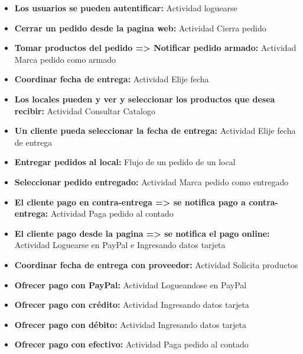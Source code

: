 \begin{itemize}
\item \textbf{Los usuarios se pueden autentificar:} Actividad loguearse
\item \textbf{Cerrar un pedido desde la pagina web:} Actividad Cierra pedido
\item \textbf{Tomar productos del pedido => Notificar pedido armado:} Actividad Marca pedido como armado
\item \textbf{Coordinar fecha de entrega:} Actividad Elije fecha
\item \textbf{Los locales pueden y ver y seleccionar los productos que desea recibir:} Actividad Consultar Catalogo
\item \textbf{Un cliente pueda seleccionar la fecha de entrega:} Actividad Elije fecha  de entrega
\item \textbf{Entregar pedidos al local:} Flujo de un pedido de un local
\item \textbf{Seleccionar pedido entregado:} Actividad Marca pedido como entregado
\item \textbf{El cliente pago en contra-entrega => se notifica pago a contra-entrega:} Actividad Paga pedido al contado
\item \textbf{El cliente pago desde la pagina => se notifica el pago online:} Actividad Loguearse en PayPal e Ingresando datos tarjeta
\item \textbf{Coordinar fecha de entrega con proveedor:} Actividad Solicita productos
\item \textbf{Ofrecer pago con PayPal:} Actividad Logueandose en PayPal
\item \textbf{Ofrecer pago con crédito:} Actividad Ingresando datos tarjeta
\item \textbf{Ofrecer pago con débito:} Actividad  Ingresando datos tarjeta
\item \textbf{Ofrecer pago con efectivo:} Actividad Paga pedido al contado

\end{itemize}

\newpage